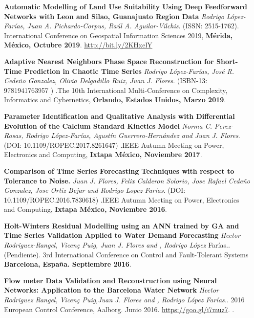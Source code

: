 \documentclass[10pt]{article}
\newenvironment{innerlist}[1][\enskip\textbullet]%
        {\begin{compactitem}[#1]}{\end{compactitem}}
\newcommand{\blankline}{\quad\pagebreak[2]}
\begin{document}
\blankline
\begin{innerlist}

\item \textbf{Automatic Modelling of Land Use Suitability Using Deep Feedforward Networks with Leon and
Silao, Guanajuato Region Data} \textit{Rodrigo López-Farías, Juan A. Pichardo-Corpus, Raúl A. Aguilar-Vilchis}. (ISSN: 2515-1762). {International Conference on Geospatial Information Sciences 2019}, \textbf{Mérida, México, Octubre 2019}. \url{http://bit.ly/2KHxelY}

\item \textbf{Adaptive Nearest Neighbors Phase Space Reconstruction for Short-Time Prediction in Chaotic Time Series} \textit{Rodrigo López-Farías, José R. Cedeño Gonzalez, Olivia Delgadillo Ruiz, Juan J. Flores}. (ISBN-13: 9781941763957 ) .{The 10th International Multi-Conference on Complexity, Informatics and Cybernetics}, \textbf{Orlando, Estados Unidos, Marzo 2019}.


\item \textbf{Parameter Identification and Qualitative Analysis with Differential Evolution of the Calcium Standard Kinetics Model} \textit{Norma C. Perez-Rosas, Rodrigo López-Farías, Agustín Guerrero-Hernández and Juan J. Flores}. (DOI: 10.1109/ROPEC.2017.8261647) .{IEEE Autumn Meeting on Power, Electronics and Computing}, \textbf{Ixtapa México, Noviembre 2017}.


\item \textbf{Comparison of Time Series Forecasting Techniques with respect to Tolerance to Noise.} \textit{Juan J. Flores, Felix Calderon Solorio, Jose Rafael Cede\~no Gonzalez, Jose Ortiz Bejar and Rodrigo Lopez Farias}. (DOI: 10.1109/ROPEC.2016.7830618) .{IEEE Autumn Meeting on Power, Electronics and Computing}, \textbf{Ixtapa México, Noviembre 2016}.


\item \textbf{Holt-Winters Residual Modelling using an ANN trained by GA and Time Series Validation Applied to Water Demand Forecasting} \textit{Hector Rodriguez-Rangel, Vicen\c{c} Puig, Juan J. Flores and ,  Rodrigo López} Farías.. (Pendiente). {3rd International Conference on Control and Fault-Tolerant Systems} \textbf{Barcelona, España. Septiembre 2016}.

\item \textbf{Flow meter Data Validation and Reconstruction using Neural Networks: Application to the Barcelona Water Network} \textit{Hector Rodriguez Rangel, Vicen\c{c} Puig,Juan J. Flores and ,  Rodrigo López Farías.}. 2016 European Control Conference, Aalborg. Junio 2016. \url{https://goo.gl/i7muz7}. .


\end{innerlist}
\end{document}
